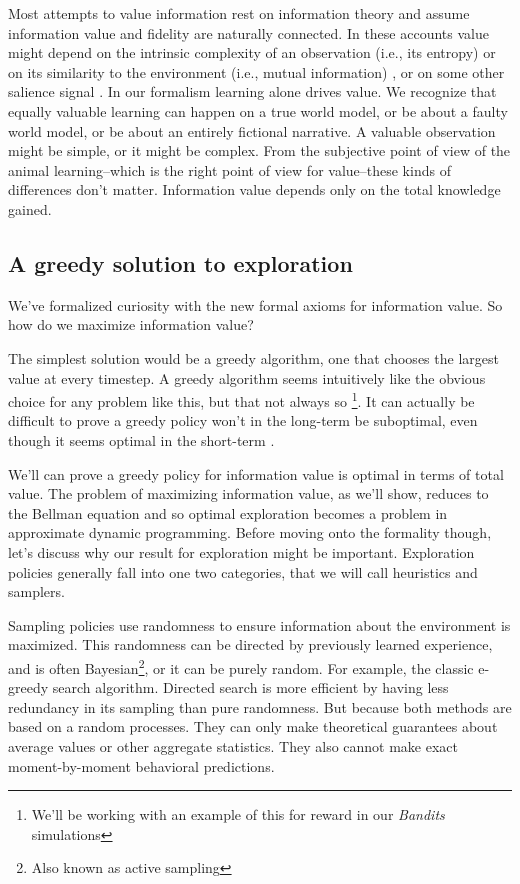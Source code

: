 \documentclass[9pt,lineno]{elife}
\begin{document}
Most attempts to value information rest on information theory and assume information value and fidelity are naturally connected. In these accounts value might depend on the intrinsic complexity of an observation (i.e., its entropy) \citep{Haarnoja2018} or on its similarity to the environment (i.e., mutual information) \citep{Kolchinsky2018}, or on some other salience signal \citep{Tishby2000}. In our formalism learning alone drives value. We recognize that equally valuable learning can happen on a true world model, or be about a faulty world model, or be about an entirely fictional narrative. A valuable observation might be simple, or it might be complex. From the subjective point of view of the animal learning--which is the right point of view for value--these kinds of differences don't matter. Information value depends only on the total knowledge gained.

\subsection*{A greedy solution to exploration} 
We've formalized curiosity with the new formal axioms for information value. So how do we maximize information value? 

The simplest solution would be a greedy algorithm, one that chooses the largest value at every timestep. A greedy algorithm seems intuitively like the obvious choice for any problem like this, but that not always so \footnote{We'll be working with an example of this for reward in our \textit{Bandits} simulations}. It can actually be difficult to prove a greedy policy won't in the long-term be suboptimal, even though it seems optimal in the short-term \cite{Roughgarden2019,Bellmann1954}.

We'll can prove a greedy policy for information value is optimal in terms of total value. The problem of maximizing information value, as we'll show, reduces to the Bellman equation \cite{Bellmann1954} and so optimal exploration becomes a problem in approximate dynamic programming. Before moving onto the formality though, let's discuss why our result for exploration might be important. Exploration policies generally fall into one two categories, that we will call heuristics and samplers.

Sampling policies use randomness to ensure information about the environment is maximized. This randomness can be directed by previously learned experience, and is often Bayesian\footnote{Also known as active sampling}, or it can be purely random. For example, the classic e-greedy search algorithm. Directed search is more efficient by having less redundancy in its sampling than pure randomness. But because both methods are based on a random processes. They can only make theoretical guarantees about average values or other aggregate statistics. They also cannot make exact moment-by-moment behavioral predictions. 
\end{document}
